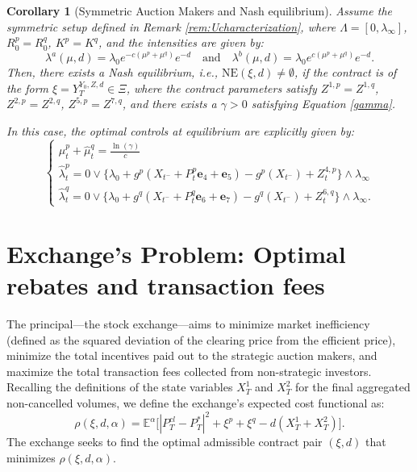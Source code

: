 \documentclass[12pt]{article}
\newtheorem{corollary}[theorem2]{Corollary}
\begin{document}
\begin{corollary}[Symmetric Auction Makers and Nash equilibrium] \label{cor:Nash}
Assume the symmetric setup defined in Remark \ref{rem:Ucharacterization}, where $\Lambda = [0,\lambda_\infty]$, $R_0^p = R_0^q$, $K^p = K^q$, and the intensities are given by:
\[\lambda^a(\mu,d) = \lambda_0 e^{-c(\mu^p+\mu^q)} e^{-d} \quad \text{and} \quad \lambda^b(\mu,d) = \lambda_0 e^{c(\mu^p + \mu^q)}e^{-d}.\]
Then, there exists a Nash equilibrium, i.e., $\text{NE}(\xi,d) \neq \emptyset$, if the contract is of the form $\xi = Y_T^{Y_0,Z,d} \in \Xi$, where the contract parameters satisfy $Z^{1,p}=Z^{1,q}$, $Z^{2,p}=Z^{2,q}$, $Z^{5,p}=Z^{7,q}$, and there exists a $\gamma > 0$ satisfying Equation \eqref{gamma}.

In this case, the optimal controls at equilibrium are explicitly given by:
\[ 
\begin{cases}
    \hat{\mu}^p_t + \hat{\mu}^q_t = \frac{\ln(\gamma)}{c} \\
    \hat{\lambda}^p_t = 0 \vee \big\{ \lambda_0 + g^p(X_{t^-} + P^p_t\mathbf{e}_4 + \mathbf{e}_5) - g^p(X_{t^-}) + Z^{4,p}_t \big\} \wedge \lambda_{\infty} \\
    \hat{\lambda}_t^q = 0 \vee \big\{ \lambda_0 + g^q(X_{t^-} + P^q_t\mathbf{e}_6 + \mathbf{e}_7) - g^q(X_{t^-}) + Z^{6,q}_t \big\} \wedge \lambda_{\infty}.
\end{cases}
\]
\end{corollary}

\section{Exchange's Problem: Optimal rebates and transaction fees}
\label{sec:principalprb}

The principal—the stock exchange—aims to minimize market inefficiency (defined as the squared deviation of the clearing price from the efficient price), minimize the total incentives paid out to the strategic auction makers, and maximize the total transaction fees collected from non-strategic investors. Recalling the definitions of the state variables $X^1_T$ and $X^2_T$ for the final aggregated non-cancelled volumes, we define the exchange's expected cost functional as:
\[ \rho(\xi,d,\alpha) = \mathbb{E}^{\alpha}\Big[ |P^{cl}_T - P_T^{*}|^2 + \xi^p + \xi^q - d(X^1_T + X^2_T) \Big]. \]
The exchange seeks to find the optimal admissible contract pair $(\xi,d)$ that minimizes $\rho(\xi,d,\alpha)$. \vspace{0.5em}
\end{document}
